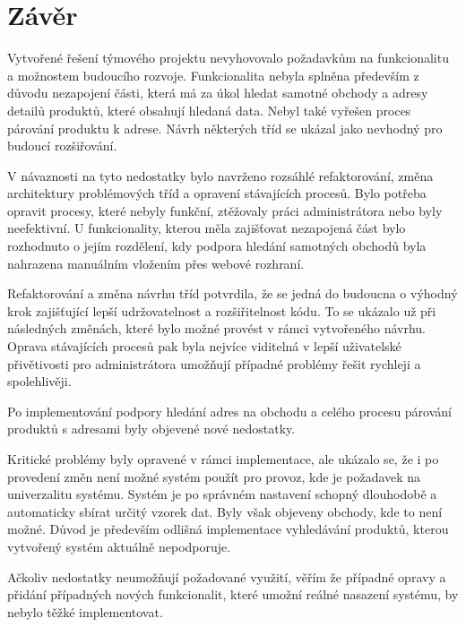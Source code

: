 \documentclass[thesis=B,czech]{FITthesis}[2012/06/26]
\begin{document}
\chapter{Závěr}
Vytvořené řešení týmového projektu nevyhovovalo požadavkům na funkcionalitu a možnostem budoucího rozvoje.
Funkcionalita nebyla splněna především z důvodu nezapojení části, která má za úkol hledat samotné obchody a adresy detailů produktů, které obsahují
hledaná data. Nebyl také vyřešen proces párování produktu k adrese. Návrh některých tříd se ukázal jako nevhodný pro budoucí rozšiřování.
\par
V návaznosti na tyto nedostatky bylo navrženo rozsáhlé refaktorování, změna architektury problémových tříd a opravení stávajících
procesů. Bylo potřeba opravit procesy, které nebyly funkční, ztěžovaly práci administrátora nebo byly neefektivní. U funkcionality, kterou měla zajišťovat nezapojená část bylo rozhodnuto o jejím rozdělení, kdy
podpora hledání samotných obchodů byla nahrazena manuálním vložením přes webové rozhraní.
\par
Refaktorování a změna návrhu tříd potvrdila, že se jedná do budoucna o výhodný krok zajišťující lepší udržovatelnost a rozšiřitelnost kódu. To se ukázalo už při následných změnách, které bylo možné provést v rámci vytvořeného návrhu.
Oprava stávajících procesů pak byla nejvíce viditelná v lepší uživatelské přivětivosti pro administrátora umožňují
případné problémy řešit rychleji a spolehlivěji.
\par
Po implementování podpory hledání adres na obchodu a celého procesu párování produktů s adresami byly
objevené nové nedostatky.
\par
Kritické problémy byly opravené v rámci implementace, ale ukázalo se, že i po provedení změn není možné systém použít pro provoz, kde
je požadavek na univerzalitu systému. Systém je po správném nastavení schopný dlouhodobě a automaticky sbírat určitý vzorek dat. Byly však objeveny obchody, kde to není možné. Důvod je především odlišná implementace vyhledávání produktů, kterou vytvořený systém aktuálně nepodporuje.
\par
Ačkoliv nedostatky neumožňují požadované využití, věřím že případné opravy a přidání případných nových funkcionalit, které
umožní reálné nasazení systému, by nebylo těžké implementovat.







\appendix
\end{document}

